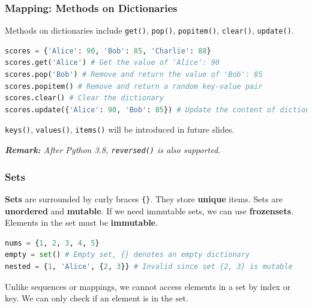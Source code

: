 \documentclass[beamer, en, version=2.0]{huangfusl-template}
\begin{document}
    \begin{frame}[fragile]
        \frametitle{Mapping: Methods on Dictionaries}

        Methods on dictionaries include {\footnotesize\verb|get()|}, {\footnotesize\verb|pop()|}, {\footnotesize\verb|popitem()|}, {\footnotesize\verb|clear()|}, {\footnotesize\verb|update()|}.

\begin{lstlisting}[language=python]
scores = {'Alice': 90, 'Bob': 85, 'Charlie': 88}
scores.get('Alice') # Get the value of 'Alice': 90
scores.pop('Bob') # Remove and return the value of 'Bob': 85
scores.popitem() # Remove and return a random key-value pair
scores.clear() # Clear the dictionary
scores.update({'Alice': 90, 'Bob': 85}) # Update the content of dictionary
\end{lstlisting}

        {\footnotesize\verb|keys()|}, {\footnotesize\verb|values()|}, {\footnotesize\verb|items()|} will be introduced in future slides.

        {\footnotesize\itshape\textbf{Remark:} After Python 3.8, \verb|reversed()| is also supported.}
    \end{frame}
    \begin{frame}[fragile]
        \frametitle{Sets}

        \textbf{Sets} are surrounded by curly braces {\footnotesize\verb|{}|}. They store \textbf{unique} items. Sets are \textbf{unordered} and \textbf{mutable}. If we need immutable sets, we can use \textbf{frozensets}. Elements in the set must be \textbf{immutable}.

\begin{lstlisting}[language=python]
nums = {1, 2, 3, 4, 5}
empty = set() # Empty set, {} denotes an empty dictionary
nested = {1, 'Alice', {2, 3}} # Invalid since set {2, 3} is mutable
\end{lstlisting}

        Unlike sequences or mappings, we cannot access elements in a set by index or key. We can only check if an element is in the set.
    \end{frame}
\end{document}
